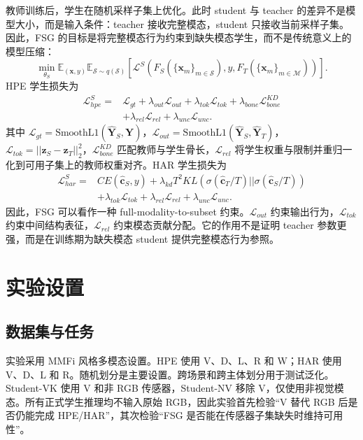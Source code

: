 \documentclass[UTF8,twocolumn]{ctexart}
\begin{document}
教师训练后，学生在随机采样子集上优化。此时 student 与 teacher 的差异不是模型大小，而是输入条件：teacher 接收完整模态，student 只接收当前采样子集。因此，FSG 的目标是将完整模态行为约束到缺失模态学生，而不是传统意义上的模型压缩：
\begin{equation}
    \min_{\theta_S}
    \mathbb{E}_{(\mathbf{x},y)}
    \mathbb{E}_{\mathcal{S}\sim q(\mathcal{S})}
    \left[
    \mathcal{L}^{S}
    (F_S(\{\mathbf{x}_m\}_{m\in\mathcal{S}}),y,F_T(\{\mathbf{x}_m\}_{m\in\mathcal{M}}))
    \right].
\end{equation}
HPE 学生损失为
\begin{equation}
\begin{aligned}
    \mathcal{L}^{S}_{hpe}=&
    \mathcal{L}_{gt}
    +\lambda_{out}\mathcal{L}_{out}
    +\lambda_{tok}\mathcal{L}_{tok}
    +\lambda_{bone}\mathcal{L}^{KD}_{bone} \\
    &+\lambda_{rel}\mathcal{L}_{rel}
    +\lambda_{unc}\mathcal{L}_{unc}.
\end{aligned}
\end{equation}
其中 $\mathcal{L}_{gt}=\mathrm{SmoothL1}(\hat{\mathbf{Y}}_S,\mathbf{Y})$，$\mathcal{L}_{out}=\mathrm{SmoothL1}(\hat{\mathbf{Y}}_S,\hat{\mathbf{Y}}_T)$，$\mathcal{L}_{tok}=||\mathbf{z}_S-\mathbf{z}_T||_2^2$，$\mathcal{L}^{KD}_{bone}$ 匹配教师与学生骨长，$\mathcal{L}_{rel}$ 将学生权重与限制并重归一化到可用子集上的教师权重对齐。HAR 学生损失为
\begin{equation}
\begin{aligned}
    \mathcal{L}^{S}_{har}=&
    CE(\hat{\mathbf{c}}_S,y)
    +\lambda_{kd}T^2 KL(\sigma(\hat{\mathbf{c}}_T/T)||\sigma(\hat{\mathbf{c}}_S/T))\\
    &+\lambda_{tok}\mathcal{L}_{tok}
    +\lambda_{rel}\mathcal{L}_{rel}
    +\lambda_{unc}\mathcal{L}_{unc}.
\end{aligned}
\end{equation}
因此，FSG 可以看作一种 full-modality-to-subset 约束。$\mathcal{L}_{out}$ 约束输出行为，$\mathcal{L}_{tok}$ 约束中间结构表征，$\mathcal{L}_{rel}$ 约束模态贡献分配。它的作用不是证明 teacher 参数更强，而是在训练期为缺失模态 student 提供完整模态行为参照。

\section{实验设置}
\subsection{数据集与任务}
实验采用 MMFi 风格多模态设置。HPE 使用 V、D、L、R 和 W；HAR 使用 V、D、L 和 R。随机划分是主要设置。跨场景和跨主体划分用于测试泛化。Student-VK 使用 V 和非 RGB 传感器，Student-NV 移除 V，仅使用非视觉模态。所有正式学生推理均不输入原始 RGB，因此实验首先检验“V 替代 RGB 后是否仍能完成 HPE/HAR”，其次检验“FSG 是否能在传感器子集缺失时维持可用性”。
\end{document}

